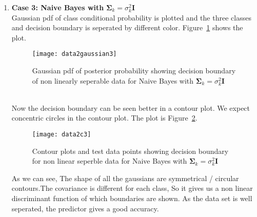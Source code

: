 \documentclass[11pt,paper=a4,answers]{exam}
\begin{document}
\begin{questions}
\begin{enumerate}[i.]
\begin{enumerate}
            \item \textbf{Case 3: Naive Bayes with} $\bm{\Sigma}_k = \sigma_k^2\bm{I}$\\
            Gaussian pdf of class conditional probability is plotted and the three classes and decision boundary is seperated by different color. Figure~\ref{fig:data2g3} shows the plot.
            \begin{figure}[ht]
                \centering
                \texttt{[image: data2gaussian3]}
                \vspace{-30pt}
                \caption{Gaussian pdf of posterior probability showing decision boundary of non linearly seperable data for Naive Bayes with $\bm{\Sigma}_k = \sigma_k^2\bm{I}$}
                \label{fig:data2g3}
            \end{figure}\\
            Now the decision boundary can be seen better in a contour plot. We expect concentric circles in the contour plot. The plot is Figure~\ref{fig:data2c3}.\\ 
            \begin{figure}[ht]
                \centering
                \texttt{[image: data2c3]}
                \vspace{-30pt}
                \caption{Contour plots and test data points showing decision boundary for non linear seperble data for Naive Bayes with $\bm{\Sigma}_k = \sigma_k^2\bm{I}$}
                \label{fig:data2c3}
            \end{figure}
            As we can see, The shape of all the gaussians are symmetrical / circular contours.The covariance is different for each class, So it gives us a non linear discriminant function of which boundaries are shown. As the data set is well seperated, the predictor gives a good accuracy.\\


\end{enumerate}
\end{enumerate}
\end{questions}
\end{document}
